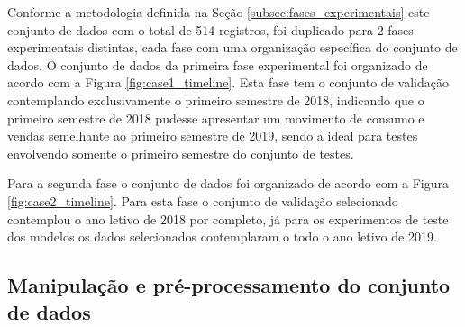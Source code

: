     Conforme a metodologia definida na Seção \ref{subsec:fases_experimentais} este conjunto de dados com o total de 514 registros, foi duplicado para 2 fases experimentais distintas, cada fase com uma organização específica do conjunto de dados. O conjunto de dados da primeira fase experimental foi organizado de acordo com a Figura \ref{fig:case1_timeline}. Esta fase tem o conjunto de validação contemplando exclusivamente o primeiro semestre de 2018, indicando que o primeiro semestre de 2018 pudesse apresentar um movimento de consumo e vendas semelhante ao primeiro semestre de 2019, sendo a ideal para testes envolvendo somente o primeiro semestre do conjunto de testes.

    \begin{figure}[htb]
        \end{figure}
    Para a segunda fase o conjunto de dados foi organizado de acordo com a Figura \ref{fig:case2_timeline}. Para esta fase o conjunto de validação selecionado  contemplou o ano letivo de 2018 por completo, já para os experimentos de teste dos modelos os dados selecionados contemplaram o todo o ano letivo de 2019.
    
    \begin{figure}[H]
        \end{figure}
   
    \subsection{Manipulação e pré-processamento do conjunto de dados}
    
